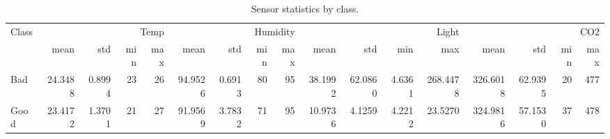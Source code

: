 \begin{table}
\caption{Sensor statistics by class.}
\label{tab:byclass}
\begin{tabular}{lrrrrrrrrrrrrrrrr}
\toprule
Class & \multicolumn{4}{r}{Temp} & \multicolumn{4}{r}{Humidity} & \multicolumn{4}{r}{Light} & \multicolumn{4}{r}{CO2} \\
 & mean & std & min & max & mean & std & min & max & mean & std & min & max & mean & std & min & max \\
\midrule
Bad & 24.3488 & 0.8994 & 23 & 26 & 94.9526 & 0.6913 & 80 & 95 & 38.1992 & 62.0860 & 4.6361 & 268.4478 & 326.6018 & 62.9395 & 20 & 477 \\
Good & 23.4172 & 1.3701 & 21 & 27 & 91.9569 & 3.7832 & 71 & 95 & 10.9736 & 4.1259 & 4.2212 & 23.5270 & 324.9816 & 57.1530 & 37 & 478 \\
\bottomrule
\end{tabular}
\end{table}
